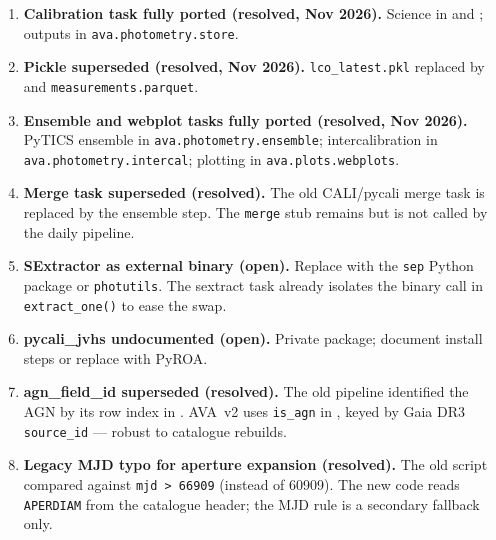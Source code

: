 \documentclass[12pt,a4paper]{article}
\begin{document}
\begin{enumerate}

\item \textbf{Calibration task fully ported (resolved, Nov 2026).}
      Science in  and ;
      outputs in \texttt{ava.photometry.store}.

\item \textbf{Pickle superseded (resolved, Nov 2026).}  \texttt{lco\_latest.pkl}
      replaced by  and
      \texttt{measurements.parquet}.

\item \textbf{Ensemble and webplot tasks fully ported (resolved, Nov 2026).}
      PyTICS ensemble in \texttt{ava.photometry.ensemble}; intercalibration in
      \texttt{ava.photometry.intercal}; plotting in \texttt{ava.plots.webplots}.

\item \textbf{Merge task superseded (resolved).}  The old CALI/pycali merge
      task is replaced by the ensemble step.  The \texttt{merge} stub remains
      but is not called by the daily pipeline.

\item \textbf{SExtractor as external binary (open).}  Replace with the
      \texttt{sep} Python package or \texttt{photutils}.  The sextract task
      already isolates the binary call in \texttt{extract\_one()} to ease the
      swap.

\item \textbf{pycali\_jvhs undocumented (open).}  Private package; document
      install steps or replace with PyROA.

\item \textbf{agn\_field\_id superseded (resolved).}  The old pipeline
      identified the AGN by its row index in .
      AVA~v2 uses \texttt{is\_agn} in , keyed
      by Gaia DR3 \texttt{source\_id} --- robust to catalogue rebuilds.

\item \textbf{Legacy MJD typo for aperture expansion (resolved).}
      The old script compared against \texttt{mjd > 66909} (instead of 60909).
      The new code reads \texttt{APERDIAM} from the catalogue header; the MJD
      rule is a secondary fallback only.

\end{enumerate}

\appendix
\end{document}

